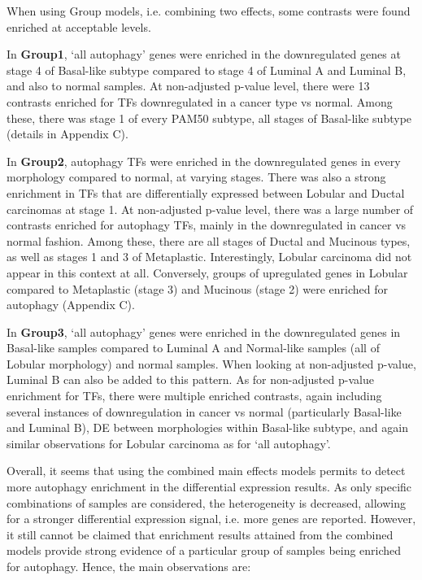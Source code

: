         \vspace{5mm}
        When using Group models, i.e. combining two effects, some contrasts were found enriched at acceptable levels.
        
        In \textbf{Group1}, ‘all autophagy’ genes were enriched in the downregulated genes at stage 4 of Basal-like subtype compared to stage 4 of Luminal A and Luminal B, and also to normal samples. At non-adjusted p-value level, there were 13 contrasts enriched for TFs downregulated in a cancer type vs normal. Among these, there was stage 1 of every PAM50 subtype, all stages of Basal-like subtype (details in Appendix C). 
         
        In \textbf{Group2}, autophagy TFs were enriched in the downregulated genes in every morphology compared to normal, at varying stages. There was also a strong enrichment in TFs that are differentially expressed between Lobular and Ductal carcinomas at stage 1. At non-adjusted p-value level, there was a large number of contrasts enriched for autophagy TFs, mainly in the downregulated in cancer vs normal fashion. Among these, there are all stages of Ductal and Mucinous types, as well as stages 1 and 3 of Metaplastic. Interestingly, Lobular carcinoma did not appear in this context at all. Conversely, groups of upregulated genes in Lobular compared to Metaplastic (stage 3) and Mucinous (stage 2) were enriched for autophagy (Appendix C). 
        
        In \textbf{Group3}, ‘all autophagy’ genes were enriched in the downregulated genes in Basal-like samples compared to Luminal A and Normal-like samples (all of Lobular morphology) and normal samples. When looking at non-adjusted p-value, Luminal B can also be added to this pattern. As for non-adjusted p-value enrichment for TFs, there were multiple enriched contrasts, again including several instances of downregulation in cancer vs normal (particularly Basal-like and Luminal B), DE between morphologies within Basal-like subtype, and again similar observations for Lobular carcinoma as for ‘all autophagy’.
        
        \newpage
        Overall, it seems that using the combined main effects models permits to detect more autophagy enrichment in the differential expression results. As only specific combinations of samples are considered, the heterogeneity is decreased, allowing for a stronger differential expression signal, i.e. more genes are reported. However, it still cannot be claimed that enrichment results attained from the combined models provide strong evidence of a particular group of samples being enriched for autophagy. Hence, the main observations are:
        
